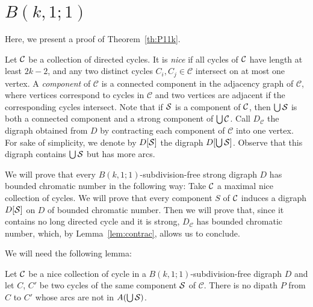 \documentclass{endm}
\begin{document}
\section{$B(k,1;1)$}\label{sec:k,1,1}


\medskip

Here, we present a proof of Theorem~\ref{th:P11k}.

Let  ${\cal C}$ be a collection of directed cycles. It is {\it nice} if all cycles of ${\cal C}$ have length at least $2k-2$, and
any two distinct cycles $C_i,C_j\in\mathcal C$ intersect on at most one vertex. %
A {\it component} of $\mathcal{C}$ is a connected component in the adjacency graph of $\mathcal{C}$, where vertices correspond to cycles in $\mathcal{C}$
and two vertices are adjacent if the corresponding cycles intersect. Note that if ${\cal S}$ is a component of ${\cal C}$, then $\bigcup{\cal S}$ is 
both a connected component and a strong component of $\bigcup{\cal C}$.
Call $D_{\mathcal{C}}$ the digraph obtained from $D$ by contracting each component of $\mathcal{C}$ into one vertex. 
For sake of simplicity, we denote by $D[{\cal S}]$ the digraph $D[\bigcup {\cal S}]$. Observe that this digraph contains $\bigcup {\cal S}$ but has more arcs.


We will prove that every $B(k,1;1)$-subdivision-free strong digraph $D$ has bounded chromatic number in the following way:
Take ${\cal C}$ a maximal nice collection of cycles. 
We will prove that every component $S$ of ${\cal C}$ induces a digraph $D[{\cal S}]$ on $D$ of bounded chromatic number. 
Then we will prove that, since it contains no long directed cycle and it is strong, $D_{\mathcal{C}}$ has bounded chromatic number,
which, by Lemma~\ref{lem:contrac}, allows us to conclude. 

We will need the following lemma:



\begin{lemma}\label{lem:headphone}
Let ${\cal C}$ be a nice collection of cycle in a $B(k,1;1)$-subdivision-free digraph $D$ and let $C$, $C'$ be two cycles of the same
component ${\cal S}$ of $\mathcal{C}$. There is no dipath $P$ from $C$ to $C'$ whose arcs are not in $A (\bigcup  {\cal S})$. 
\end{lemma}
\end{document}
